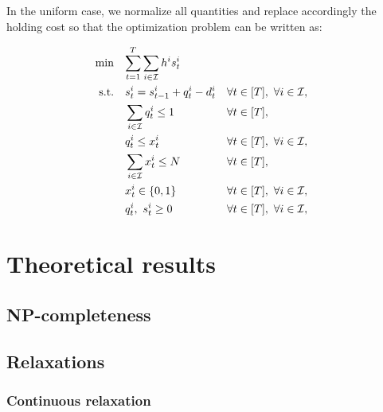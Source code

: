 \medskip

In the uniform case, we normalize all quantities and replace accordingly the holding cost so that the optimization problem can be written as:

\begin{subequations}\label{eq:Uniform-CLSP-BS}
  \begin{align}
    \min\quad & \rlap{$\ds \sum_{t=1}^{\horizon} \sum_{i\in\REF} \holding^i \inventory_t^i$}
    \label{eq:Uniform-CLSP-BS:objective}
    \\
    \st\quad & \ds \inventory_t^i = \inventory_{t-1}^i + \quantity_t^i - \demand_t^i && \forall t\in\range{\horizon},\ \forall i\in\REF,
    \label{eq:Uniform-CLSP-BS:stock-dynamics}
    \\
    & \ds \sum_{i\in\REF} \quantity_t^i \le 1 && \forall t\in\range{\horizon},
    \label{eq:Uniform-CLSP-BS:capacity}
    \\
    & \ds \quantity_t^i \le \setup_t^i && \forall t\in\range{\horizon},\ \forall i\in\REF,
    \label{eq:Uniform-CLSP-BS:item-capacity}
    \\
    & \ds \sum_{i\in\REF} \setup_t^i \le \nbsetups && \forall t\in\range{\horizon},
    \label{eq:Uniform-CLSP-BS:setups}
    \\
    & \ds \setup_t^i \in \crbracket{0,1} && \forall t\in\range{\horizon},\ \forall i\in\REF,
    \label{eq:Uniform-CLSP-BS:boolean}
    \\
    & \ds \quantity_t^i,\ \inventory_t^i \ge 0 && \forall t\in\range{\horizon},\ \forall i\in\REF,
    \label{eq:Uniform-CLSP-BS:positivity}
  \end{align}
\end{subequations}


\section{Theoretical results}


\subsection{NP-completeness}


\subsection{Relaxations}

\subsubsection{Continuous relaxation}

